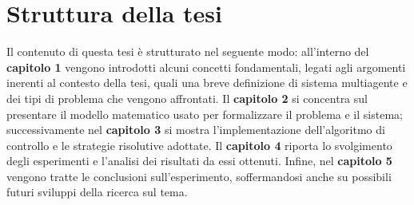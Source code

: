 \section*{Struttura della tesi} \label{sec:struttura_tesi}

Il contenuto di questa tesi è strutturato nel seguente modo: all'interno del \textbf{capitolo 1} vengono introdotti alcuni concetti fondamentali, legati agli argomenti inerenti al contesto della tesi, quali una breve definizione di sistema multiagente e dei tipi di problema che vengono affrontati. Il \textbf{capitolo 2} si concentra sul presentare il modello matematico usato per formalizzare il problema e il sistema; successivamente nel \textbf{capitolo 3} si mostra l'implementazione dell'algoritmo di controllo e le strategie risolutive adottate.
Il \textbf{capitolo 4} riporta lo svolgimento degli esperimenti e l'analisi dei risultati da essi ottenuti.
Infine, nel \textbf{capitolo 5} vengono tratte le conclusioni sull'esperimento, soffermandosi anche su possibili futuri sviluppi della ricerca sul tema.